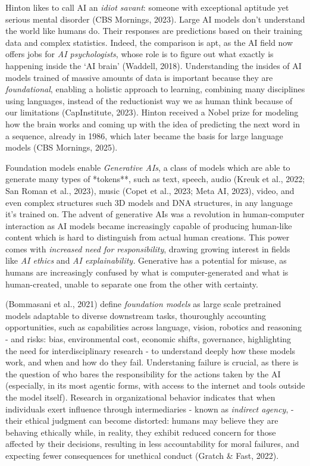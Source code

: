 \documentclass[
  letterpaper,
  DIV=11,
  numbers=noendperiod]{scrartcl}
\begin{document}
Hinton likes to call AI an \emph{idiot savant}: someone with exceptional
aptitude yet serious mental disorder (CBS Mornings, 2023). Large AI
models don't understand the world like humans do. Their responses are
predictions based on their training data and complex statistics. Indeed,
the comparison is apt, as the AI field now offers jobs for \emph{AI
psychologists}, whose role is to figure out what exactly is happening
inside the `AI brain' (Waddell, 2018). Understanding the insides of AI
models trained of massive amounts of data is important because they are
\emph{foundational}, enabling a holistic approach to learning, combining
many disciplines using languages, instead of the reductionist way we as
human think because of our limitations (CapInstitute, 2023). Hinton
received a Nobel prize for modeling how the brain works and coming up
with the idea of predicting the next word in a sequence, already in
1986, which later became the basis for large language models (CBS
Mornings, 2025).

Foundation models enable \emph{Generative AIs}, a class of models which
are able to generate many types of *tokens**, such as text, speech,
audio (Kreuk et al., 2022; San Roman et al., 2023), music (Copet et al.,
2023; Meta AI, 2023), video, and even complex structures such 3D models
and DNA structures, in any language it's trained on. The advent of
generative AIs was a revolution in human-computer interaction as AI
models became increasingly capable of producing human-like content which
is hard to distinguish from actual human creations. This power comes
with \emph{increased need for responsibility}, drawing growing interest
in fields like \emph{AI ethics} and \emph{AI explainability.} Generative
has a potential for misuse, as humans are increasingly confused by what
is computer-generated and what is human-created, unable to separate one
from the other with certainty.

(Bommasani et al., 2021) define \emph{foundation models} as large scale
pretrained models adaptable to diverse downstream tasks, thouroughly
accounting opportunities, such as capabilities across language, vision,
robotics and reasoning - and risks: bias, environmental cost, economic
shifts, governance, highlighting the need for interdisciplinary research
- to understand deeply how these models work, and when and how do they
fail. Understaning failure is crucial, as there is the question of who
bares the responsibility for the actions taken by the AI (especially, in
its most agentic forms, with access to the internet and tools outside
the model itself). Research in organizational behavior indicates that
when individuals exert influence through intermediaries - known as
\emph{indirect agency}, - their ethical judgment can become distorted:
humans may believe they are behaving ethically while, in reality, they
exhibit reduced concern for those affected by their decisions, resulting
in less accountability for moral failures, and expecting fewer
consequences for unethical conduct (Gratch \& Fast, 2022).
\end{document}
